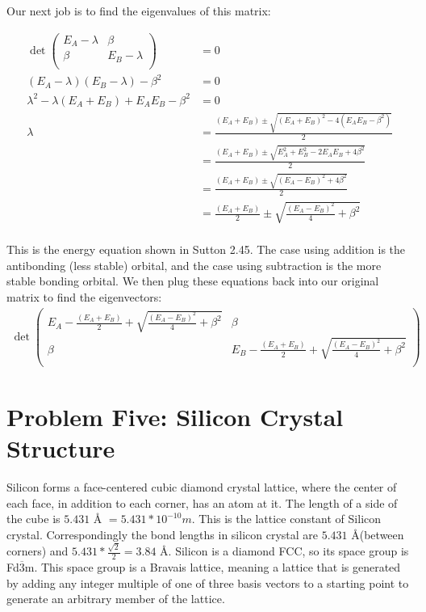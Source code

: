 \documentclass[10pt]{article} %
\begin{document}
Our next job is to find the eigenvalues of this matrix:

\begin{align*}
  \det\begin{pmatrix}
    E_A-\lambda & \beta\\
    \beta & E_B-\lambda\\
  \end{pmatrix}
  &= 0\\
  (E_A-\lambda)(E_B-\lambda) - \beta^2 &= 0\\
  \lambda^2 - \lambda(E_A + E_B )+ E_AE_B - \beta^2 &= 0\\
  \lambda &= \frac{(E_A + E_B) \pm \sqrt{(E_A + E_B)^2 - 4(E_AE_B - \beta^2)}}{2}\\
  &= \frac{(E_A + E_B) \pm \sqrt{E_A^2 + E_B^2 - 2E_AE_B + 4\beta^2}}{2}\\
  &= \frac{(E_A + E_B) \pm \sqrt{(E_A - E_B)^2 + 4\beta^2}}{2}\\
  &= \frac{(E_A + E_B)}{2} \pm \sqrt{\frac{(E_A - E_B)^2}{4} + \beta^2}\\
\end{align*}

This is the energy equation shown in Sutton 2.45. The case using addition is the antibonding (less
stable) orbital, and the case using subtraction is the more stable bonding orbital. We then plug
these equations back into our original matrix to find the eigenvectors:\\

\begin{align*}
  \det\begin{pmatrix}
    E_A - \frac{(E_A + E_B)}{2} + \sqrt{\frac{(E_A - E_B)^2}{4} + \beta^2} & \beta\\
    \beta & E_B - \frac{(E_A + E_B)}{2} + \sqrt{\frac{(E_A - E_B)^2}{4} + \beta^2}\\
  \end{pmatrix}
\end{align*}


\section{Problem Five: Silicon Crystal Structure}
Silicon forms a face-centered cubic diamond crystal lattice, where the center of each face, in
addition to each corner, has an atom at it. The length of a side of the cube is $5.431$ \AA
$= 5.431 * 10^{-10}m$. This is the lattice constant of Silicon crystal. Correspondingly the
bond lengths in silicon crystal are $5.431$ \AA (between corners) and
$5.431 * \frac{\sqrt{2}}{2} = 3.84$ \AA.
\hspace{2cm}
Silicon is a diamond FCC, so its space group is Fd$\overline{3}$m. This space group is a
Bravais lattice, meaning a lattice that is generated by adding any integer multiple of one
of three basis vectors to a starting point to generate an arbitrary member of the lattice.\\
\end{document}

